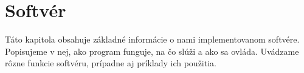 \chapter{Softvér}
\label{kap:softver}

Táto kapitola obsahuje základné informácie o nami implementovanom softvére. Popisujeme v nej, ako program funguje, na čo slúži a ako sa ovláda. Uvádzame rôzne funkcie softvéru, prípadne aj príklady ich použitia.